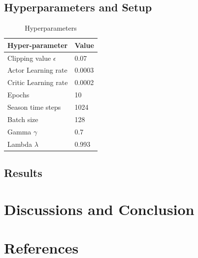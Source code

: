 \documentclass{article}
\begin{document}
\subsection{Hyperparameters and Setup}
\begin{table}[H]
\centering
\begin{tabular}{|l|l|}
\hline
\textbf{Hyper-parameter}  & \textbf{Value} \\ \hline
Clipping value $\epsilon$ & 0.07           \\ \hline
Actor Learning rate       & 0.0003         \\ \hline
Critic Learning rate      & 0.0002         \\ \hline
Epochs                    & 10             \\ \hline
Season time steps         & 1024           \\ \hline
Batch size                & 128            \\ \hline
Gamma $\gamma$            & 0.7            \\ \hline
Lambda $\lambda$          & 0.993          \\ \hline
\end{tabular}
\caption{Hyperparameters}
\label{hyperparams}
\end{table}
\subsection{Results}

\section{Discussions and Conclusion}

\section{References}
\end{document}
